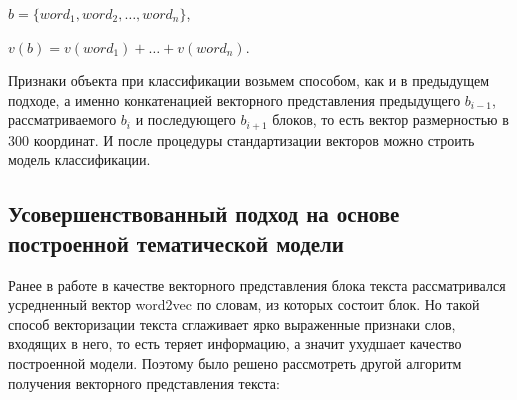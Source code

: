 \documentclass[12pt]{article}
\begin{document}
$b = \{word_1, word_2, …, word_n\}$,

$v(b) = v(word_1) +\ldots + v(word_n)$.

Признаки объекта при классификации возьмем способом, как и в предыдущем подходе, а именно конкатенацией векторного представления предыдущего $b_{i-1}$, рассматриваемого $b_i$ и последующего $b_{i+1}$ блоков, то есть вектор размерностью в 300 координат. И после процедуры стандартизации векторов можно строить модель классификации.

\subsection{Усовершенствованный подход на основе построенной тематической модели}
Ранее в работе в качестве векторного представления блока текста рассматривался усредненный вектор word2vec по словам, из которых состоит блок. Но такой способ векторизации текста сглаживает ярко выраженные признаки слов, входящих в него, то есть теряет информацию, а значит ухудшает качество построенной модели. Поэтому было решено рассмотреть другой алгоритм получения векторного представления текста:
\end{document}
